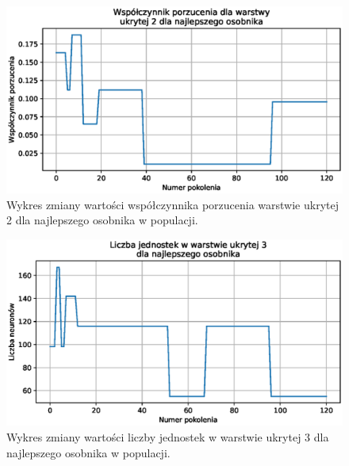 \documentclass[a4paper,12pt]{article}
\numberwithin{figure}{section}
\begin{document}
    \begin{figure}[H]
        \centering
        \includegraphics[width=\textwidth]{g_a_best_hidden_2_dropout_rate}
        \caption{Wykres zmiany wartości współczynnika porzucenia warstwie ukrytej 2 dla najlepszego osobnika w populacji.}
        \label{fig:g_a_best_hidden_2_dropout_rate}
    \end{figure}

    \smallskip

    \begin{figure}[H]
        \centering
        \includegraphics[width=\textwidth]{g_a_best_hidden_3_units}
        \caption{Wykres zmiany wartości liczby jednostek w warstwie ukrytej 3 dla najlepszego osobnika w populacji.}
        \label{fig:g_a_best_hidden_3_units}
    \end{figure}

    \smallskip
\end{document}
